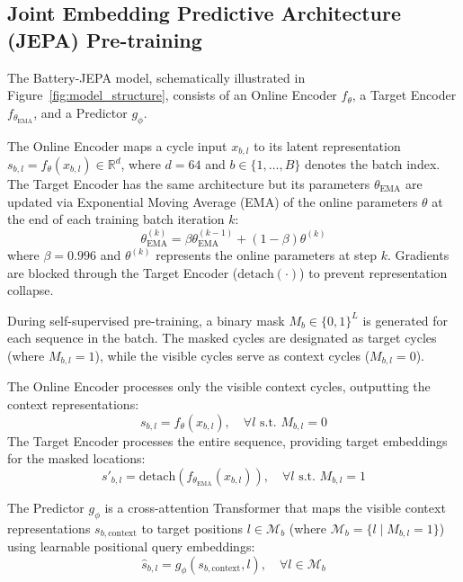 \documentclass[a4paper,fleqn]{cas-dc}
\begin{document}
\subsection{Joint Embedding Predictive Architecture (JEPA) Pre-training}
The Battery-JEPA model, schematically illustrated in Figure~\ref{fig:model_structure}, consists of an Online Encoder $f_\theta$, a Target Encoder $f_{\theta_{\text{EMA}}}$, and a Predictor $g_\phi$.

The Online Encoder maps a cycle input $x_{b, l}$ to its latent representation $s_{b, l} = f_\theta(x_{b, l}) \in \mathbb{R}^d$, where $d = 64$ and $b \in \{1, \dots, B\}$ denotes the batch index. The Target Encoder has the same architecture but its parameters $\theta_{\text{EMA}}$ are updated via Exponential Moving Average (EMA) of the online parameters $\theta$ at the end of each training batch iteration $k$:
\begin{equation}
    \theta_{\text{EMA}}^{(k)} = \beta \theta_{\text{EMA}}^{(k-1)} + (1 - \beta) \theta^{(k)}
\end{equation}
where $\beta = 0.996$ and $\theta^{(k)}$ represents the online parameters at step $k$. Gradients are blocked through the Target Encoder ($\text{detach}(\cdot)$) to prevent representation collapse.

During self-supervised pre-training, a binary mask $M_b \in \{0, 1\}^L$ is generated for each sequence in the batch. The masked cycles are designated as target cycles (where $M_{b, l} = 1$), while the visible cycles serve as context cycles ($M_{b, l} = 0$).

The Online Encoder processes only the visible context cycles, outputting the context representations:
\begin{equation}
    s_{b, l} = f_\theta(x_{b, l}), \quad \forall l \text{ s.t. } M_{b, l} = 0
\end{equation}
The Target Encoder processes the entire sequence, providing target embeddings for the masked locations:
\begin{equation}
    s'_{b, l} = \text{detach}(f_{\theta_{\text{EMA}}}(x_{b, l})), \quad \forall l \text{ s.t. } M_{b, l} = 1
\end{equation}

The Predictor $g_\phi$ is a cross-attention Transformer that maps the visible context representations $s_{b, \text{context}}$ to target positions $l \in \mathcal{M}_b$ (where $\mathcal{M}_b = \{l \mid M_{b, l} = 1\}$) using learnable positional query embeddings:
\begin{equation}
    \hat{s}_{b, l} = g_\phi(s_{b, \text{context}}, l), \quad \forall l \in \mathcal{M}_b
\end{equation}
\end{document}
